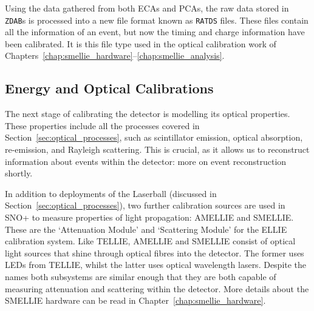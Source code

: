 Using the data gathered from both ECAs and PCAs, the raw data stored in \texttt{ZDAB}s is processed into a new file format known as \texttt{RATDS} files. These files contain all the information of an event, but now the timing and charge information have been calibrated. It is this file type used in the optical calibration work of Chapters~\ref{chap:smellie_hardware}--\ref{chap:smellie_analysis}.

\subsection{Energy and Optical Calibrations}\label{sec:eo_calibs}
The next stage of calibrating the detector is modelling its optical properties. These properties include all the processes covered in Section~\ref{sec:optical_processes}, such as scintillator emission, optical absorption, re-emission, and Rayleigh scattering.
This is crucial, as it allows us to reconstruct information about events within the detector: more on event reconstruction shortly.

In addition to deployments of the Laserball (discussed in Section~\ref{sec:optical_processes}), two further calibration sources are used in SNO+ to measure properties of light propagation: AMELLIE and SMELLIE. These are the `Attenuation Module' and `Scattering Module' for the ELLIE calibration system. Like TELLIE, AMELLIE and SMELLIE consist of optical light sources that shine through optical fibres into the detector. The former uses LEDs from TELLIE, whilst the latter uses optical wavelength lasers. Despite the names both subsystems are similar enough that they are both capable of measuring attenuation and scattering within the detector. More details about the SMELLIE hardware can be read in Chapter~\ref{chap:smellie_hardware}.

